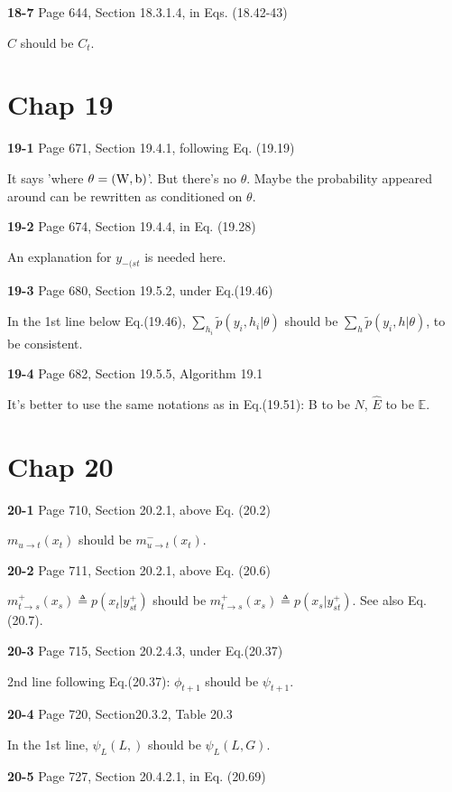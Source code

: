\documentclass[aps,preprint,a4]{revtex4-1}
\begin{document}
{\color{red}\textbf{18-7}} Page 644, Section 18.3.1.4, in Eqs. (18.42-43)

$C$ should be $C_{t}$.

\section{Chap 19}
{\color{red}\textbf{19-1}} Page 671, Section 19.4.1, following Eq. (19.19)

It says 'where $\theta=(\rm W,b)$'. But there's no $\theta$. 
Maybe the probability appeared around can be rewritten as conditioned on $\theta$.

{\color{red}\textbf{19-2}} Page 674, Section 19.4.4, in Eq. (19.28)

An explanation for $y_{-(st}$ is needed here.

{\color{red}\textbf{19-3}} Page 680, Section 19.5.2, under Eq.(19.46)

In the 1st line below  Eq.(19.46), $\sum_{h_{i}}\tilde p(y_{i},h_{i}|\theta)$ should be
$\sum_{h}\tilde p(y_{i},h|\theta)$, to be consistent.

{\color{red}\textbf{19-4}} Page 682, Section 19.5.5, Algorithm 19.1

It's better to use the same notations as in Eq.(19.51): B to be $N$, $\hat E$ to be $\mathbb E$.

\section{Chap 20}
{\color{red}\textbf{20-1}} Page 710, Section 20.2.1, above Eq. (20.2)

$m_{u\rightarrow t}(x_{t})$ should be $m^{-}_{u\rightarrow t}(x_{t})$.

{\color{red}\textbf{20-2}} Page 711, Section 20.2.1, above Eq. (20.6)

$m_{t\rightarrow s}^{+}(x_{s})\triangleq p(x_{t}|y_{st}^{+})$ should be 
$m_{t\rightarrow s}^{+}(x_{s})\triangleq p(x_{s}|y_{st}^{+})$. See also Eq. (20.7).

{\color{red}\textbf{20-3}} Page 715, Section 20.2.4.3, under Eq.(20.37)

2nd line following Eq.(20.37): $\phi_{t+1}$ should be $\psi_{t+1}$.

{\color{red}\textbf{20-4}} Page 720,  Section20.3.2, Table 20.3

In the 1st line, $\psi_{L}(L,)$ should be $\psi_{L}(L,G)$.

{\color{red}\textbf{20-5}} Page 727, Section 20.4.2.1, in Eq. (20.69)
\end{document}
